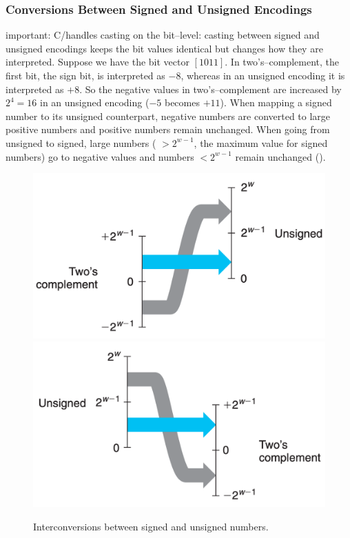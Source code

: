 \documentclass[../bryant_comp_sys.tex]{subfiles}
\begin{document}
            \subsubsection{Conversions Between Signed and Unsigned Encodings}
                \begin{outline}
                    \1 \alert{important}: C/\Cpp handles casting on the bit--level: casting between signed and unsigned encodings keeps the bit values identical but changes how they are interpreted.
                        \2 Suppose we have the bit vector \( \left[ 1011 \right] \).
                            \3 In two's--complement, the first bit, the sign bit, is interpreted as \( -8 \), whereas in an unsigned encoding it is interpreted as \( +8 \). So the negative values in two's--complement are increased by \( 2^4 = 16 \) in an unsigned encoding (\(-5\) becomes \(+11\)).
                    \1 When mapping a signed number to its unsigned counterpart, negative numbers are converted to large positive numbers and positive numbers remain unchanged. When going from unsigned to signed, large numbers ( \( >2^{w-1} \), the maximum value for signed numbers) go to negative values and numbers \( <2^{w-1} \) remain unchanged ().

                    \begin{figure}[h]
                        \centering
                        \includegraphics[width=0.4\linewidth]{ch2/figs/signed_to_unsigned.png}
                        \includegraphics[width=0.4\linewidth]{ch2/figs/unsigned_to_signed.png}
                        \caption{Interconversions between signed and unsigned numbers.}
                        \label{fig:encodingConversion}
                    \end{figure}
                \end{outline}
\end{document}
